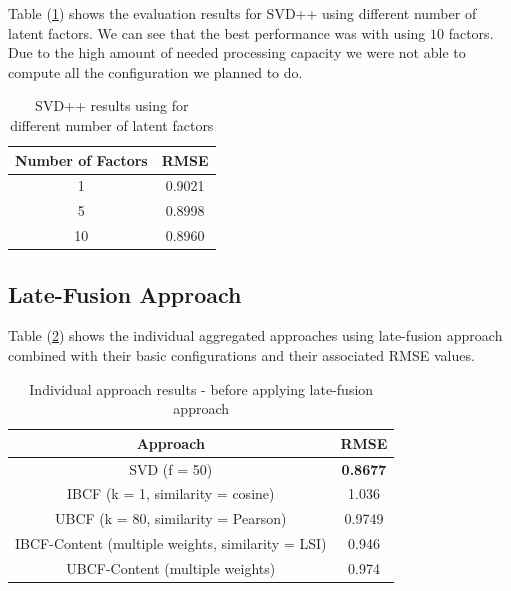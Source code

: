 \documentclass{sigish}
\begin{document}
Table (\ref{tab:svd_results}) shows the evaluation results for SVD++ using different number of latent factors. We can see that the best performance was with using $ 10 $ factors.
Due to the high amount of needed processing capacity we were not able to compute all the configuration we planned to do.
\begin{table}[]
	\centering
	\begin{tabular}{|c|c|}
		\hline
		\textbf{Number of Factors}                  & \textbf{RMSE} \\ \hline
		1 & 0.9021        \\ \hline
		5 & 0.8998        \\ \hline
		10 & 0.8960      \\ \hline
	\end{tabular}
	\caption{SVD++ results using for different number of latent factors}
	\label{tab:svd_results}
\end{table}

\subsection{Late-Fusion Approach}
Table (\ref{tab:late_fusion_old_results}) shows the individual aggregated approaches using late-fusion approach combined with their basic configurations and their associated RMSE values.
\begin{table}
	\begin{tabular}{|c|c|}
		\hline
		\textbf{Approach} & \textbf{RMSE} \\ \hline
		SVD (f = 50) & \textbf{0.8677}        \\ \hline
		IBCF (k = 1, similarity = cosine)  & 1.036         \\ \hline
		UBCF (k = 80, similarity = Pearson) & 0.9749          \\ \hline
		IBCF-Content (multiple weights, similarity = LSI) & 0.946         \\ \hline
		UBCF-Content (multiple weights) & 0.974         \\ \hline
	\end{tabular}
	\caption{Individual approach results - before applying late-fusion approach}
	\label{tab:late_fusion_old_results}
\end{table}
\end{document}
